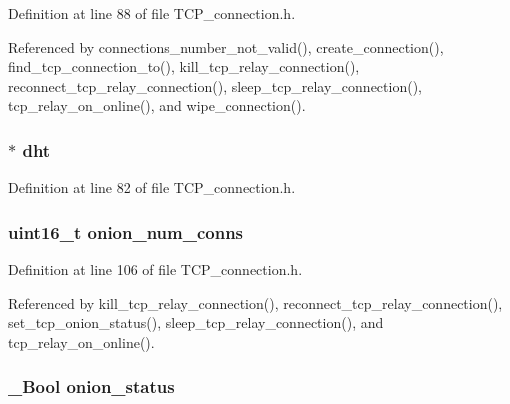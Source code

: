 Definition at line 88 of file T\+C\+P\+\_\+connection.\+h.



Referenced by connections\+\_\+number\+\_\+not\+\_\+valid(), create\+\_\+connection(), find\+\_\+tcp\+\_\+connection\+\_\+to(), kill\+\_\+tcp\+\_\+relay\+\_\+connection(), reconnect\+\_\+tcp\+\_\+relay\+\_\+connection(), sleep\+\_\+tcp\+\_\+relay\+\_\+connection(), tcp\+\_\+relay\+\_\+on\+\_\+online(), and wipe\+\_\+connection().

\hypertarget{struct_t_c_p___connections_a8b3d6ce8745acc52695e252bdb1531b6}{
\subsubsection[{dht}]{$\ast$ dht}}\label{struct_t_c_p___connections_a8b3d6ce8745acc52695e252bdb1531b6}


Definition at line 82 of file T\+C\+P\+\_\+connection.\+h.

\hypertarget{struct_t_c_p___connections_a6e6576b39dc12d06b344fae03ba2d772}{
\subsubsection[{onion\+\_\+num\+\_\+conns}]{\setlength{\rightskip}{0pt plus 5cm}uint16\+\_\+t onion\+\_\+num\+\_\+conns}}\label{struct_t_c_p___connections_a6e6576b39dc12d06b344fae03ba2d772}


Definition at line 106 of file T\+C\+P\+\_\+connection.\+h.



Referenced by kill\+\_\+tcp\+\_\+relay\+\_\+connection(), reconnect\+\_\+tcp\+\_\+relay\+\_\+connection(), set\+\_\+tcp\+\_\+onion\+\_\+status(), sleep\+\_\+tcp\+\_\+relay\+\_\+connection(), and tcp\+\_\+relay\+\_\+on\+\_\+online().

\hypertarget{struct_t_c_p___connections_a4eead70704aaec336687c7a248a22522}{
\subsubsection[{onion\+\_\+status}]{\setlength{\rightskip}{0pt plus 5cm}\+\_\+\+Bool onion\+\_\+status}}\label{struct_t_c_p___connections_a4eead70704aaec336687c7a248a22522}


